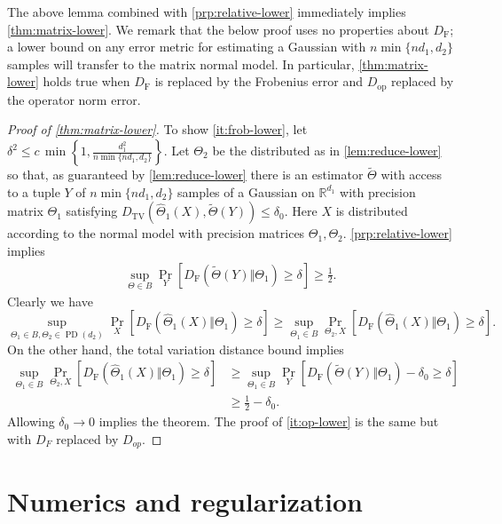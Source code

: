 \documentclass[aos]{imsart}
\theoremstyle{definition}
\numberwithin{equation}{section}
\DeclareMathOperator{\PD}{PD}
\newcommand{\R}{{\mathbb{R}}}
\newcommand{\htheta}{\widehat{\Theta}}
\newcommand{\DF}{D_{\operatorname{F}}}
\newcommand{\Dop}{D_{\operatorname{op}}}
\newcommand{\DTV}{D_{\operatorname{TV}}}
\newcommand{\CF}[1]{{\color{purple}[CF: #1]}}
\newcommand{\CF}[1]{{}}
\begin{document}
The above lemma combined with \cref{prp:relative-lower} immediately implies \cref{thm:matrix-lower}. We remark that the below proof uses no properties about $\DF$; a lower bound on any error metric for estimating a Gaussian with $n \min \{n d_1, d_2\}$ samples will transfer to the matrix normal model. In particular, \cref{thm:matrix-lower} holds true when $\DF$ is replaced by the Frobenius error and $\Dop$ replaced by the operator norm error.
\begin{proof}[Proof of \cref{thm:matrix-lower}]

To show \cref{it:frob-lower}, let $\delta^2 \leq c \, \min \left\{1,\frac{d_1^2}{n \min \{n d_1, d_2\}}\right\}$. Let $\Theta_2$ be the distributed as in \cref{lem:reduce-lower} so that, as guaranteed by \cref{lem:reduce-lower} there is an estimator $\tilde{\Theta}$ with access to a tuple $Y$ of $n \min \{n d_1, d_2\}$ samples of a Gaussian on $\R^{d_1}$ with precision matrix $\Theta_1$ satisfying $\DTV (\htheta_1(X), \tilde{\Theta}(Y)) \leq \delta_0$. Here $X$ is distributed according to the normal model with precision matrices $\Theta_1, \Theta_2$. \cref{prp:relative-lower} implies \begin{align*}
\sup_{\Theta \in B} \Pr_Y\left[ \DF(\tilde{\Theta}(Y)\Vert  \Theta_1)  \geq \delta\right] \geq \frac{1}{2}.
\end{align*}
Clearly we have
$$\sup_{\Theta_1 \in B, \Theta_2 \in \PD(d_2)} \Pr_{X}
\left[ \DF(\htheta_1(X)\Vert  \Theta_1) \geq \delta \right]
\geq \sup_{\Theta_1 \in B} \Pr_{\Theta_2, X}\left[ \DF(\htheta_1(X)\Vert  \Theta_1)\geq \delta\right].$$
On the other hand, the total variation distance bound implies
\begin{align*}
\sup_{\Theta_1 \in B} \Pr_{\Theta_2, X}\left[ \DF(\htheta_1(X)\Vert  \Theta_1)\geq \delta\right]
&\geq \sup_{\Theta_1 \in B} \Pr_{Y}\left[ \DF(\tilde{\Theta}(Y)\Vert  \Theta_1) - \delta_0
 \geq \delta\right]\\
&\geq \frac{1}{2}  -  \delta_0.
\end{align*}
Allowing $\delta_0 \to 0$ implies the theorem. The proof of \cref{it:op-lower} is the same but with $D_{F}$ replaced by $D_{op}$.
\end{proof}



\section{Numerics and regularization}\label{sec:numerics}
\end{document}
